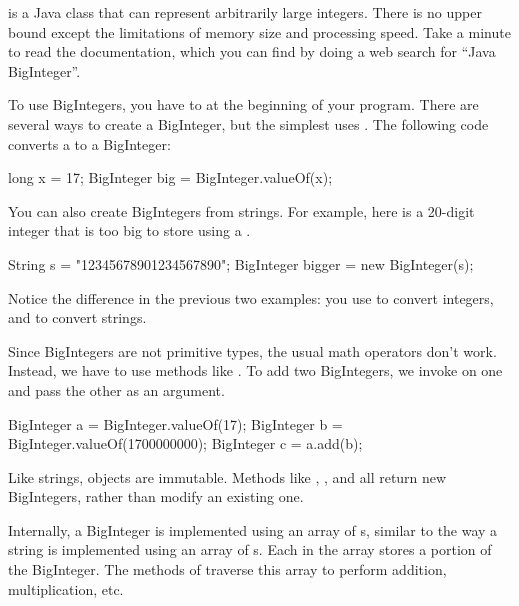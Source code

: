 
 is a Java class that can represent arbitrarily large integers.
There is no upper bound except the limitations of memory size and processing speed.
Take a minute to read the documentation, which you can find by doing a web search for ``Java BigInteger''.



To use BigIntegers, you have to  at the beginning of your program.
There are several ways to create a BigInteger, but the simplest uses .
The following code converts a  to a BigInteger:

\begin{code}
long x = 17;
BigInteger big = BigInteger.valueOf(x);
\end{code}

You can also create BigIntegers from strings.
For example, here is a 20-digit integer that is too big to store using a .

\begin{code}
String s = "12345678901234567890";
BigInteger bigger = new BigInteger(s);
\end{code}

Notice the difference in the previous two examples: you use  to convert integers, and  to convert strings.

Since BigIntegers are not primitive types, the usual math operators don't work.
Instead, we have to use methods like .
To add two BigIntegers, we invoke  on one and pass the other as an argument.

\begin{code}
BigInteger a = BigInteger.valueOf(17);
BigInteger b = BigInteger.valueOf(1700000000);
BigInteger c = a.add(b);
\end{code}

Like strings,  objects are immutable.
Methods like , , and  all return new BigIntegers, rather than modify an existing one.

Internally, a BigInteger is implemented using an array of s, similar to the way a string is implemented using an array of s.
Each  in the array stores a portion of the BigInteger.
The methods of  traverse this array to perform addition, multiplication, etc.


